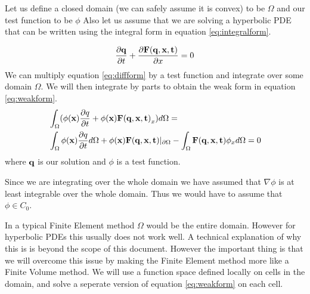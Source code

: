 \documentclass[10]{amsart}
\begin{document}
Let us define a closed domain (we can safely assume it is convex) to be $\Omega$ and our test function to be $\phi$   
Also let us assume that we are solving a hyperbolic PDE that can be written using the integral form in equation
\eqref{eq:integralform}.

\begin{equation}
 \frac{\partial {\bf q}}{\partial t} + \frac{\partial {\bf F(q,x,t)}}{\partial x}=0
 \label{eq:diffform}
\end{equation}
We can multiply equation \ref{eq:diffform} by a test function and integrate over some domain $\Omega$. 
We will then integrate by parts to obtain the weak
form in equation \eqref{eq:weakform}.
\begin{align}
 &\int_{\Omega} (\phi({\bf x}) \frac{\partial q}{\partial t} + \phi({\bf x})  {\bf F(q,x,t)}_x) d\Omega
=\nonumber \\ 
&\int_{\Omega} \phi({\bf x}) \frac{\partial q}{\partial t} d\Omega +  \phi({\bf x}) {\bf F(q,x,t)} |_{\partial \Omega}
 -\int_{\Omega}{\bf F(q,x,t)} \phi_x d\Omega =0 \label{eq:weakform}
 \end{align}
 where ${\bf q}$ is our solution and $\phi$ is a test function. 
 
 Since we are integrating over the whole domain
 we have assumed that $\nabla \phi$ is at least integrable over the whole domain. 
 Thus we would have to assume that $\phi \in 
 C_0$. 
 
 In a typical Finite Element method $\Omega$ would be the entire domain. However for hyperbolic PDEs this usually
 does not work well. A technical explanation of why this is is beyond the scope of this document. However the important thing
 is that we will overcome this issue by making the Finite Element method more like a Finite Volume method. We will use
 a function space defined locally on cells in the domain, and solve a seperate version of equation \eqref{eq:weakform} 
 on each cell.
\end{document}
